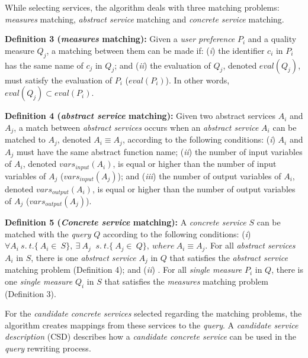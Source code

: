 While selecting services, the algorithm deals with three matching problems: \textit{measures} matching, \textit{abstract service} matching and \textit{concrete service} matching.

\noindent \textbf{Definition 3 (\textit{measures} matching):} 
Given a \textit{user preference} $P_{i}$ and a quality measure $Q_{j}$, a matching between them can be made if:
(\textit{i}) the identifier $c_{i}$ in $P_{i}$ has the same name of $c_{j}$ in $Q_{j}$; and
(\textit{ii}) the evaluation of $Q_{j}$, denoted $eval(Q_{j})$, must satisfy the evaluation of $P_{i}$ ($eval(P_{i})$). In other words, $eval(Q_{j}) \subset eval(P_{i})$.

\noindent \textbf{Definition 4 (\textit{abstract service} matching):} 
Given two abstract services $A_{i}$ and $A_{j}$, a match between \textit{abstract services} occurs when an \textit{abstract service} $A_{i}$ can be matched to $A_{j}$, denoted $A_{i} \equiv A_{j}$, according to the following conditions: 
(\textit{i}) $A_{i}$ and $A_{j}$ must have the same abstract function name; 
(\textit{ii}) the number of input variables of $A_{i}$, denoted $vars_{input}(A_{i})$, is equal or higher than the number of input variables of $A_{j}$ ($vars_{input}(A_{j})$); and 
(\textit{iii}) the number of output variables of $A_{i}$, denoted $vars_{output}(A_{i})$, is equal or higher than the number of output variables of $A_{j}$ ($vars_{output}(A_{j})$).

\noindent \textbf{Definition 5 (\textit{Concrete service} matching):} 
A \textit{concrete service} $S$ can be matched with the \textit{query} $Q$ according to the following conditions:
(\textit{i}) $\forall A_{i}  \ s. \ t. \lbrace\ A_{i} \in \ S\rbrace, \ \exists \ A_{j} \ $ $s. \ t. \lbrace\ A_{j} \in \ Q\rbrace, \ where \ A_{i} \equiv A_{j}.$ For all \textit{abstract services} $A_{i}$ in $S$, there is one \textit{abstract service} $A_{j}$ in $Q$ that satisfies the \textit{abstract service} matching problem (Definition 4); and
(\textit{ii}) . For all \textit{single measure} $P_{i}$ in $Q$, there is one \textit{single measure} $Q_{i}$ in $S$ that satisfies the \textit{measures} matching problem (Definition 3).

For the \textit{candidate concrete services} selected regarding the matching problems, the algorithm creates mappings from these services to the \textit{query}.
A \textit{candidate service description} (CSD) describes how a \textit{candidate concrete service} can be used in the \textit{query} rewriting process.


